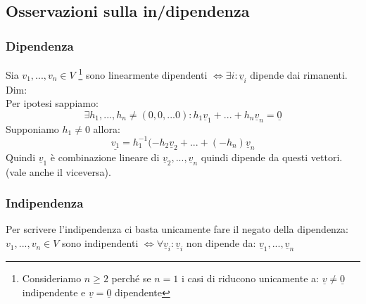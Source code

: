 \subsection{Osservazioni sulla in/dipendenza}
\subsubsection{Dipendenza}
Sia $v_1,...,v_n \in V$ \footnote{Consideriamo $n \ge 2$ perché se $n = 1$ i casi di riducono unicamente a: $ \underline{v} \neq \underline{0} $ indipendente e $ \underline{v} = \underline{0} $ dipendente} sono linearmente dipendenti $ \Leftrightarrow \exists i: \underline{v}_i $ dipende dai rimanenti.
Dim:\\
Per ipotesi sappiamo: 
$$ \exists h_1,...,h_n \neq (0,0,...0): h_1\underline{v}_1 + ... + h_n\underline{v}_n = \underline{0} $$
Supponiamo $h_1 \neq 0$ allora:
$$ \underline{v_1} = h_1^{-1}(-h_2\underline{v}_2 + ... + (-h_n)\underline{v}_n $$
Quindi $\underline{v}_1$ è combinazione lineare di $\underline{v}_2,...,\underline{v}_n$ quindi dipende da questi vettori.\\
(vale anche il viceversa).

\subsubsection{Indipendenza}
Per scrivere l'indipendenza ci basta unicamente fare il negato della dipendenza:\\
$ v_1,...,v_n \in V $ sono indipendenti $ \Leftrightarrow \forall \underline{v}_i: \underline{v}_i$ non dipende da: $\underline{v}_1,...,\underline{v}_n $\\

